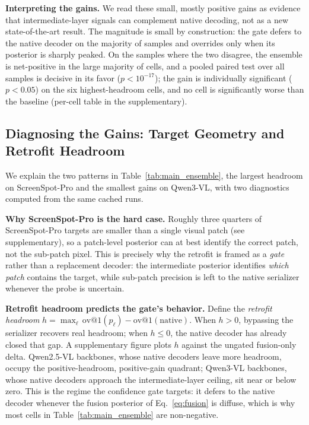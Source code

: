 \textbf{Interpreting the gains.}
We read these small, mostly positive gains as evidence that intermediate-layer signals can complement native decoding, not as a new state-of-the-art result. The magnitude is small by construction: the gate defers to the native decoder on the majority of samples and overrides only when its posterior is sharply peaked. On the samples where the two disagree, the ensemble is net-positive in the large majority of cells, and a pooled paired test over all samples is decisive in its favor ($p{<}10^{-17}$); the gain is individually significant ($p{<}0.05$) on the six highest-headroom cells, and no cell is significantly worse than the baseline (per-cell table in the supplementary).

\subsection{Diagnosing the Gains: Target Geometry and Retrofit Headroom}
\label{sec:experiments:sspro}

We explain the two patterns in Table~\ref{tab:main_ensemble}, the largest headroom on ScreenSpot-Pro and the smallest gains on Qwen3-VL, with two diagnostics computed from the same cached runs.

\textbf{Why ScreenSpot-Pro is the hard case.}
Roughly three quarters of ScreenSpot-Pro targets are smaller than a single visual patch (see supplementary), so a patch-level posterior can at best identify the correct patch, not the sub-patch pixel. This is precisely why the retrofit is framed as a \emph{gate} rather than a replacement decoder: the intermediate posterior identifies \emph{which patch} contains the target, while sub-patch precision is left to the native serializer whenever the probe is uncertain.

\textbf{Retrofit headroom predicts the gate's behavior.}
Define the \emph{retrofit headroom} $h=\max_\ell\,\mathrm{ov@1}(p_\ell)-\mathrm{ov@1}(\text{native})$. When $h>0$, bypassing the serializer recovers real headroom; when $h\le0$, the native decoder has already closed that gap. A supplementary figure plots $h$ against the ungated fusion-only delta. Qwen2.5-VL backbones, whose native decoders leave more headroom, occupy the positive-headroom, positive-gain quadrant; Qwen3-VL backbones, whose native decoders approach the intermediate-layer ceiling, sit near or below zero. This is the regime the confidence gate targets: it defers to the native decoder whenever the fusion posterior of Eq.~\ref{eq:fusion} is diffuse, which is why most cells in Table~\ref{tab:main_ensemble} are non-negative.


